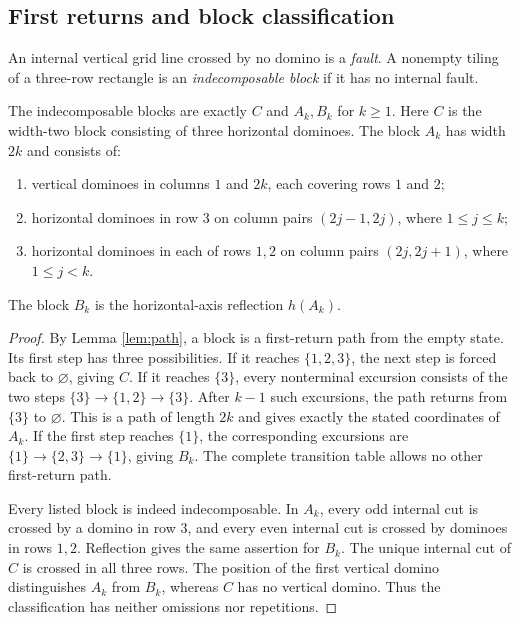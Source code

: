 \subsection{First returns and block classification}
\begin{definition}
An internal vertical grid line crossed by no domino is a
\emph{fault}. A nonempty tiling of a three-row rectangle is an
\emph{indecomposable block} if it has no internal fault.
\end{definition}

\begin{lemma}\label{lem:blocks}
The indecomposable blocks are exactly $C$ and $A_k,B_k$ for $k\ge1$.
Here $C$ is the width-two block consisting of three horizontal
dominoes. The block $A_k$ has width $2k$ and consists of:
\begin{enumerate}
\item vertical dominoes in columns $1$ and $2k$, each covering
rows $1$ and $2$;
\item horizontal dominoes in row $3$ on column pairs
$(2j-1,2j)$, where $1\le j\le k$;
\item horizontal dominoes in each of rows $1,2$ on column pairs
$(2j,2j+1)$, where $1\le j<k$.
\end{enumerate}
The block $B_k$ is the horizontal-axis reflection $h(A_k)$.
\end{lemma}
\begin{proof}
By Lemma \ref{lem:path}, a block is a first-return path from the
empty state. Its first step has three possibilities.
If it reaches $\{1,2,3\}$, the next step is forced back to
$\varnothing$, giving $C$.
If it reaches $\{3\}$, every nonterminal excursion consists of
the two steps
$\{3\}\to\{1,2\}\to\{3\}$.
After $k-1$ such excursions, the path returns from $\{3\}$ to
$\varnothing$. This is a path of length $2k$ and gives exactly
the stated coordinates of $A_k$.
If the first step reaches $\{1\}$, the corresponding excursions
are $\{1\}\to\{2,3\}\to\{1\}$, giving $B_k$.
The complete transition table allows no other first-return path.

Every listed block is indeed indecomposable.
In $A_k$, every odd internal cut is crossed by a domino in row
$3$, and every even internal cut is crossed by dominoes in rows
$1,2$. Reflection gives the same assertion for $B_k$.
The unique internal cut of $C$ is crossed in all three rows.
The position of the first vertical domino distinguishes $A_k$
from $B_k$, whereas $C$ has no vertical domino.
Thus the classification has neither omissions nor repetitions.
\end{proof}

